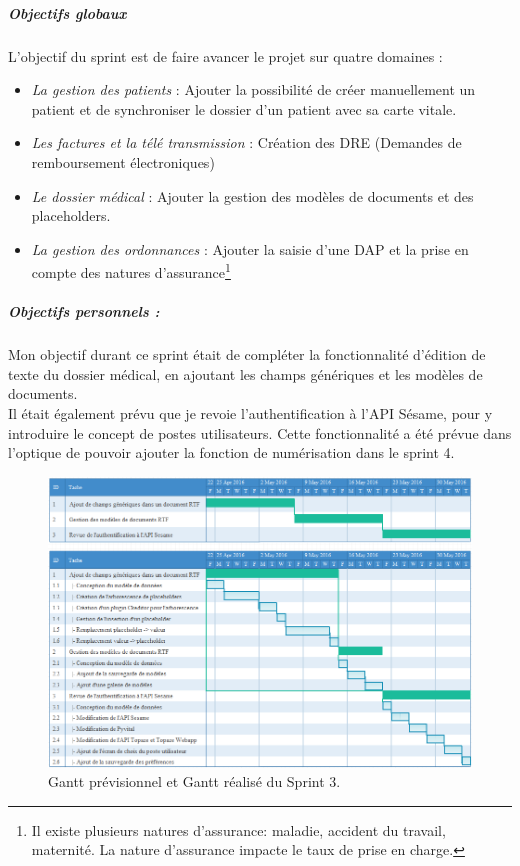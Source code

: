 \subparagraph{Objectifs globaux}
L'objectif du sprint est de faire avancer le projet sur quatre domaines : 
\begin{itemize}
\item \textit{La gestion des patients} : Ajouter la possibilité de créer manuellement un patient et de synchroniser le dossier d'un patient avec sa carte vitale.

\item \textit{Les factures et la télé transmission} :
Création des \gls{DRE} (Demandes de remboursement électroniques)

\item \textit{Le dossier médical} : Ajouter la gestion des modèles de documents et des placeholders.

\item \textit{La gestion des ordonnances} : Ajouter la saisie d'une \gls{DAP} et la prise en compte des natures d'assurance\footnote{Il existe plusieurs natures d'assurance: maladie, accident du travail, maternité. La nature d'assurance impacte le taux de prise en charge.}
\end{itemize} 

\subparagraph{Objectifs personnels :}
Mon objectif durant ce sprint était de compléter la fonctionnalité d'édition de texte du dossier médical, en ajoutant les champs génériques et les modèles de documents.\\
Il était également prévu que je revoie l'authentification à l'API Sésame, pour y introduire le concept de postes utilisateurs. Cette fonctionnalité a été prévue dans l'optique de pouvoir ajouter la fonction de numérisation dans le sprint 4.

\begin{figure}[H]
  \centering
  \centerline{\includegraphics[width=20.5cm]{./img/gantt_sprint3}}
  \caption{\label{fig:mb_va_ast} Gantt prévisionnel et Gantt réalisé du Sprint 3.}
\end{figure}

